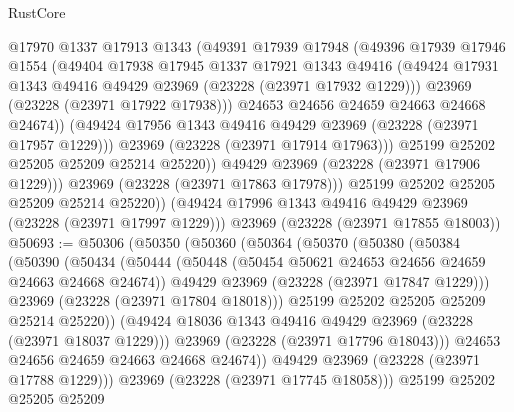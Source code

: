 \begin{lexlean}{RustCore}
\begin{coremodule}
                  @17970
                  @1337
                  @17913
                  @1343
                  (@49391
                    @17939
                    @17948
                    (@49396
                      @17939
                      @17946
                      @1554
                      (@49404
                        @17938
                        @17945
                        @1337
                        @17921
                        @1343
                        @49416
                        (@49424 @17931 @1343 @49416 @49429 @23969 (@23228 (@23971 @17932 @1229)))
                        @23969
                        (@23228 (@23971 @17922 @17938)))
                      @24653
                      @24656
                      @24659
                      @24663
                      @24668
                      @24674))
                  (@49424 @17956 @1343 @49416 @49429 @23969 (@23228 (@23971 @17957 @1229)))
                  @23969
                  (@23228 (@23971 @17914 @17963)))
                @25199
                @25202
                @25205
                @25209
                @25214
                @25220))
            @49429
            @23969
            (@23228 (@23971 @17906 @1229)))
          @23969
          (@23228 (@23971 @17863 @17978)))
        @25199
        @25202
        @25205
        @25209
        @25214
        @25220))
    (@49424 @17996 @1343 @49416 @49429 @23969 (@23228 (@23971 @17997 @1229)))
    @23969
    (@23228 (@23971 @17855 @18003))
@50693 := @50306
    (@50350
      (@50360
        (@50364
          (@50370
            (@50380
              (@50384
                (@50390
                  (@50434
                    (@50444
                      (@50448 (@50454 @50621 @24653 @24656 @24659 @24663 @24668 @24674))
                      @49429
                      @23969
                      (@23228 (@23971 @17847 @1229)))
                    @23969
                    (@23228 (@23971 @17804 @18018)))
                  @25199
                  @25202
                  @25205
                  @25209
                  @25214
                  @25220))
              (@49424 @18036 @1343 @49416 @49429 @23969 (@23228 (@23971 @18037 @1229)))
              @23969
              (@23228 (@23971 @17796 @18043)))
            @24653
            @24656
            @24659
            @24663
            @24668
            @24674))
        @49429
        @23969
        (@23228 (@23971 @17788 @1229)))
      @23969
      (@23228 (@23971 @17745 @18058)))
    @25199
    @25202
    @25205
    @25209

\end{coremodule}
\end{lexlean}
